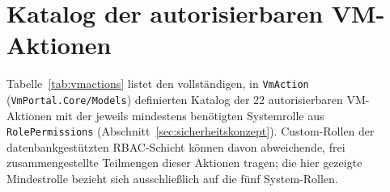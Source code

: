 \documentclass[12pt,a4paper]{article}
\begin{document}
\section{Katalog der autorisierbaren VM-Aktionen}
\label{app:vmactions}

Tabelle~\ref{tab:vmactions} listet den vollständigen, in \texttt{VmAction} (\texttt{VmPortal.Core/Models}) definierten Katalog der 22 autorisierbaren VM-Aktionen mit der jeweils mindestens benötigten Systemrolle aus \texttt{RolePermissions} (Abschnitt~\ref{sec:sicherheitskonzept}). Custom-Rollen der datenbankgestützten RBAC-Schicht können davon abweichende, frei zusammengestellte Teilmengen dieser Aktionen tragen; die hier gezeigte Mindestrolle bezieht sich ausschließlich auf die fünf System-Rollen.

\end{document}
